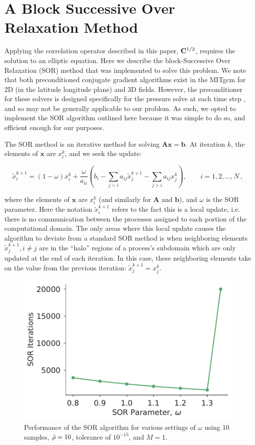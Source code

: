 \section{A Block Successive Over Relaxation Method}
\label{sec:block_sor}

Applying the correlation operator described in this paper, $\mathbf{C}^{1/2}$,
requires the solution to an elliptic equation.
Here we describe the block-Successive Over Relaxation (SOR) method that was
implemented to solve this problem.
We note that both preconditioned conjugate gradient algorithms exist in the
MITgcm for 2D (in the latitude longitude plane) and 3D fields.
However, the preconditioner for these solvers is designed specifically for the
pressure solve at each time step \citep{marshall_finite-volume_1997},
and so may not be generally applicable to our problem.
As such, we opted to implement the SOR algorithm outlined here because it was
simple to do so, and efficient enough for our purposes.

The SOR method is an iterative method for solving $\mathbf{A}\mathbf{x} = \mathbf{b}$.
At iteration $k$, the elements of $\mathbf{x}$ are $x_i^k$, and we seek the update:
\begin{linenomath*}\begin{equation}
    \tilde{x}_i^{k+1} = (1-\omega) x_i^k + \dfrac{\omega}{a_{ii}}
    \left( b_i - \sum_{j<i}a_{ij}\tilde{x}_j^{k+1} -
        \sum_{j>i}a_{ij}x_j^{k}\right), \qquad
        i=1,2,...,N \, ,
    \label{eq:sor_update}
\end{equation}\end{linenomath*}
where the elements of $\mathbf{x}$ are $x_i^k$ (and similarly for $\mathbf{A}$
and $\mathbf{b}$), and $\omega$ is the SOR parameter.
Here the notation $\tilde{x}_i^{k+1}$ refers to the fact this is a local update,
i.e. there is no communication between the processes assigned to each portion of
the computational domain.
The only areas where this local update causes the algorithm to deviate from a
standard SOR method is when neighboring elements
$\tilde{x}^{k+1}_{j}, i\ne j$ are in the ``halo'' regions of a process's
subdomain which are only updated at the end of each iteration.
In this case, these neighboring elements take on the value from the previous
iteration: $\tilde{x}^{k+1}_j = x^k_j$.

\begin{figure}
    \centering
    \includegraphics[width=.5\textwidth]{../figures/smith_fig8.pdf}
    \caption{Performance of the SOR algorithm for various settings of $\omega$
        using 10 samples, $\hat{\rho}=10$, tolerance of $10^{-15}$, and $M=1$.
    }
    \label{fig:sor}
\end{figure}

